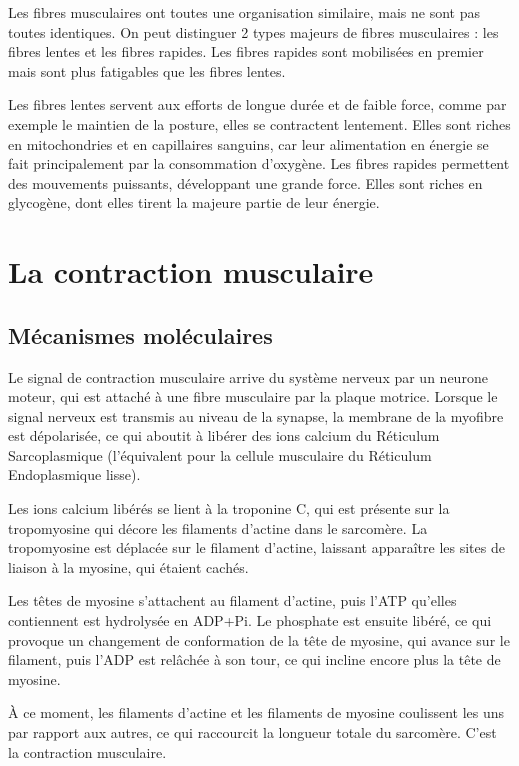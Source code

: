 Les fibres musculaires ont toutes une organisation similaire, mais ne sont pas toutes identiques. 
On peut distinguer 2 types majeurs de fibres musculaires : les fibres lentes et les fibres rapides. Les fibres rapides sont mobilisées en premier mais sont plus fatigables que les fibres lentes.  

Les fibres lentes servent aux efforts de longue durée et de faible force, comme par exemple le maintien de la posture, elles se contractent lentement. 
Elles sont riches en mitochondries et en capillaires sanguins, car leur alimentation en énergie se fait principalement par la consommation d'oxygène. 
Les fibres rapides permettent des mouvements puissants, développant une grande force. Elles sont riches en glycogène, dont elles tirent la majeure partie de leur énergie. 





\section{La contraction musculaire}

\subsection{Mécanismes moléculaires}

Le signal de contraction musculaire arrive du système nerveux par un neurone moteur, qui est attaché à une fibre musculaire par la plaque motrice.
Lorsque le signal nerveux est transmis au niveau de la synapse, la membrane de la myofibre est dépolarisée, ce qui aboutit à libérer des ions calcium du Réticulum Sarcoplasmique (l'équivalent pour la cellule musculaire du Réticulum Endoplasmique lisse). 

Les ions calcium libérés se lient à la troponine C, qui est présente sur la tropomyosine qui décore les filaments d'actine dans le sarcomère. La tropomyosine est déplacée sur le filament d'actine, laissant apparaître les sites de liaison à la myosine, qui étaient cachés. 

Les têtes de myosine s'attachent au filament d'actine, puis l'ATP qu'elles contiennent est hydrolysée en ADP+Pi. Le phosphate est ensuite libéré, ce qui provoque un changement de conformation de la tête de myosine, qui avance sur le filament, puis l'ADP est relâchée à son tour, ce qui incline encore plus la tête de myosine. 

À ce moment, les filaments d'actine et les filaments de myosine coulissent les uns par rapport aux autres, ce qui raccourcit la longueur totale du sarcomère. C'est la contraction musculaire. 

